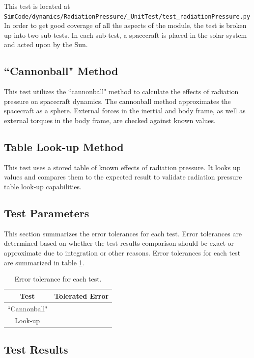 \documentclass[]{BasiliskReportMemo}
\newcommand{\testname}{test\_radiationPressure.py }
\begin{document}
This test is located at {\tt SimCode/dynamics/RadiationPressure/\_UnitTest/\testname} In order to get good coverage of all the aspects of the module, the test is broken up into two sub-tests. In each sub-test, a spacecraft is placed in the solar system and acted upon by the Sun. \par

\subsection{``Cannonball" Method} This test utilizes the ``cannonball" method to calculate the effects of radiation pressure on spacecraft dynamics. The cannonball method approximates the spacecraft as a sphere. External forces in the inertial and body frame, as well as external torques in the body frame, are checked against known values.
\subsection{Table Look-up Method} This test uses a stored table of known effects of radiation pressure. It looks up values and compares them to the expected result to validate radiation pressure table look-up capabilities.


\subsection{Test Parameters}

This section summarizes the error tolerances for each test. Error tolerances are determined based on whether the test results comparison should be exact or approximate due to integration or other reasons. Error tolerances for each test are summarized in table \ref{tab:errortol}. 

\begin{table}[htbp]
	\caption{Error tolerance for each test.}
	\label{tab:errortol}
	\centering \fontsize{10}{10}\selectfont
	\begin{tabular}{ c | c } %
		\hline
		\textbf{Test}   							& \textbf{Tolerated Error} 						  \\ \hline
		``Cannonball" &		   \\ \hline
		Look-up					& 														   \\ \hline
	\end{tabular}
\end{table}


\subsection{Test Results}
\end{document}
